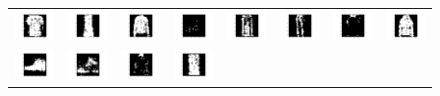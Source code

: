 \documentclass[12pt]{report}
\begin{document}
\begin{figure}[H]
\begin{tabular}{cccccccc}
  \includegraphics[width=0.1\linewidth]{qn2_i_24.png} &   \includegraphics[width=0.1\linewidth]{qn2_i_25.png} &
  \includegraphics[width=0.1\linewidth]{qn2_i_26.png} &   \includegraphics[width=0.1\linewidth]{qn2_i_27.png} &
  \includegraphics[width=0.1\linewidth]{qn2_i_28.png} &   \includegraphics[width=0.1\linewidth]{qn2_i_29.png} &
  \includegraphics[width=0.1\linewidth]{qn2_i_30.png} &   \includegraphics[width=0.1\linewidth]{qn2_i_31.png} \\
  \includegraphics[width=0.1\linewidth]{qn2_i_32.png} &   \includegraphics[width=0.1\linewidth]{qn2_i_33.png} &
  \includegraphics[width=0.1\linewidth]{qn2_i_34.png} &   \includegraphics[width=0.1\linewidth]{qn2_i_35.png} &

\end{tabular}
\end{figure}
\end{document}

